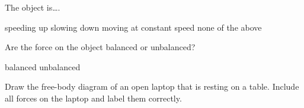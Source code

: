 \documentclass[answers]{exam}
\begin{document}
\begin{questions}
\question \label{71tbo}
The object is\dots .

\begin{randomizechoices}
    \choice speeding up
    \correctchoice slowing down
    \choice moving at constant speed 
    \choice none of the above
\end{randomizechoices}

\question \label{3M4Xb}
Are the force on the object balanced or unbalanced?

\begin{randomizeoneparchoices}[norandomize]
    \choice balanced
    \correctchoice unbalanced
\end{randomizeoneparchoices}

\fi

\clearpage

\ifprintanswers
    \printkeytable
\fi

\clearpage

\question[3]
Draw the free-body diagram of an open laptop that is resting on a table. Include all forces on the laptop and label them correctly. 


\begin{solutionorbox}[6cm]
\begin{center}
\end{center}
\end{solutionorbox}



\end{questions}
\end{document}
